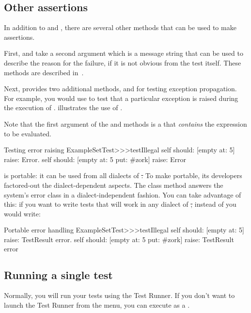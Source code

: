 \documentclass[a4paper,10pt,twoside]{book}
\begin{document}
\subsection{Other assertions}
In addition to  and , there are several other methods that can be used to make assertions.

First,  and  take a second argument which is a message string that can be used to describe the reason for the failure, if it is not obvious from the test itself.   These methods are described in~.

Next, \sunit provides two additional methods,  and
 for testing exception propagation.
For example, you would use 
 to test that a particular exception is raised during the execution of .  
illustrates the use of \mbox{.}

Note that the first argument of the  and  methods is a  that \emph{contains} the expression to be evaluated.   

\begin{method}[ESTtestIllegal]{Testing error raising}
ExampleSetTest>>>testIllegal
	self should: [empty at: 5] raise: Error.
	self should: [empty at: 5 put: #zork] raise: Error
\end{method}

\sunit is portable: it can be used from all dialects of \st.  To make
\sunit portable, its developers factored-out the dialect-dependent aspects.  The class method  answers
the system's error class in a dialect-independent fashion. 
You can take advantage of this: if you want to write tests that will work in any dialect of \st, instead of 
 you would write:

\begin{method}[portabletestillegal]{Portable error handling}
ExampleSetTest>>>testIllegal
	self should: [empty at: 5] raise: TestResult error.
	self should: [empty at: 5 put: #zork] raise: TestResult error
\end{method}


\subsection{Running a single test}
Normally, you will run your tests using the Test Runner.
If you don't want to launch the Test Runner from the  menu, you can execute  as a .
\end{document}

